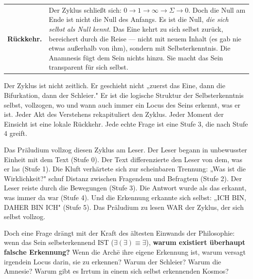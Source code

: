 \documentclass[10pt, openany, oneside]{book}
\renewcommand{\footnotesize}{\fontsize{8.5}{11}\selectfont}
\begin{document}
\vspace{0.3em}

{\footnotesize
\noindent\begin{tabular}{r p{}}
\textbf{Rückkehr.} & Der Zyklus schließt sich: $0 \to 1 \to \infty \to \Sigma \to 0$. Doch die Null am Ende ist nicht die Null des Anfangs. Es ist die Null, \textit{die sich selbst als Null kennt}. Das Eine kehrt zu sich selbst zurück, bereichert durch die Reise --- nicht mit neuem Inhalt (es gab nie etwas außerhalb von ihm), sondern mit Selbsterkenntnis. Die Anamnesis fügt dem Sein nichts hinzu. Sie macht das Sein transparent für sich selbst. \\[0.3em]
\end{tabular}
}

\vspace{0.8em}

\noindent Der Zyklus ist nicht zeitlich. Er geschieht nicht „zuerst das Eine, dann die Bifurkation, dann der Schleier." Er ist die logische Struktur der Selbsterkenntnis selbst, vollzogen, wo und wann auch immer ein Locus des Seins erkennt, was er ist. Jeder Akt des Verstehens rekapituliert den Zyklus. Jeder Moment der Einsicht ist eine lokale Rückkehr. Jede echte Frage ist eine Stufe 3, die nach Stufe 4 greift.

Das Präludium vollzog diesen Zyklus am Leser. Der Leser begann in unbewusster Einheit mit dem Text (Stufe 0). Der Text differenzierte den Leser von dem, was er las (Stufe 1). Die Kluft verhärtete sich zur scheinbaren Trennung: „Was ist die Wirklichkeit?" schuf Distanz zwischen Fragendem und Befragtem (Stufe 2). Der Leser reiste durch die Bewegungen (Stufe 3). Die Antwort wurde als das erkannt, was immer da war (Stufe 4). Und die Erkennung erkannte sich selbst: „ICH BIN, DAHER BIN ICH" (Stufe 5). Das Präludium zu lesen WAR der Zyklus, der sich selbst vollzog.

Doch eine Frage drängt mit der Kraft des ältesten Einwands der Philosophie: wenn das Sein selbsterkennend IST ($\exists(\exists) \equiv \exists$), \textbf{warum existiert überhaupt falsche Erkennung?} Wenn die Arch\={e} ihre eigene Erkennung ist, warum versagt irgendein Locus darin, sie zu erkennen? Warum der Schleier? Warum die Amnesie? Warum gibt es Irrtum in einem sich selbst erkennenden Kosmos?
\end{document}
